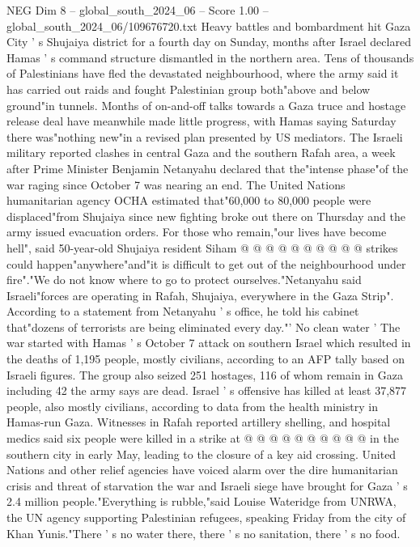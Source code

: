 \begin{textsample}{NEG Dim 8 – global\_south\_2024\_06 – Score 1.00 – global\_south\_2024\_06/109676720.txt}  \label{ex:f8_neg_244}
Heavy battles and bombardment hit Gaza City ' s Shujaiya district for a fourth day on Sunday, months after Israel declared Hamas ' s command structure dismantled in the northern area.
Tens of thousands of Palestinians have fled the devastated neighbourhood, where the army said it has carried out raids and fought Palestinian group both"above and below ground"in tunnels.
Months of on-and-off talks towards a Gaza truce and hostage release deal have meanwhile made little progress, with Hamas saying Saturday there was"nothing new"in a revised plan presented by US mediators.
The Israeli military reported clashes in central Gaza and the southern Rafah area, a week after Prime Minister Benjamin Netanyahu declared that the"intense phase"of the war raging since October 7 was nearing an end.
The United Nations humanitarian agency OCHA estimated that"60,000 to 80,000 people were displaced"from Shujaiya since new fighting broke out there on Thursday and the army issued evacuation orders.
For those who remain,"our lives have become hell", said 50-year-old Shujaiya resident Siham @ @ @ @ @ @ @ @ @ @ strikes could happen"anywhere"and"it is difficult to get out of the neighbourhood under fire"."We do not know where to go to protect ourselves."Netanyahu said Israeli"forces are operating in Rafah, Shujaiya, everywhere in the Gaza Strip".
According to a statement from Netanyahu ' s office, he told his cabinet that"dozens of terrorists are being eliminated every day."' No clean water ' The war started with Hamas ' s October 7 attack on southern Israel which resulted in the deaths of 1,195 people, mostly civilians, according to an AFP tally based on Israeli figures.
The group also seized 251 hostages, 116 of whom remain in Gaza including 42 the army says are dead.
Israel ' s offensive has killed at least 37,877 people, also mostly civilians, according to data from the health ministry in Hamas-run Gaza.
Witnesses in Rafah reported artillery shelling, and hospital medics said six people were killed in a strike at @ @ @ @ @ @ @ @ @ @ in the southern city in early May, leading to the closure of a key aid crossing.
United Nations and other relief agencies have voiced alarm over the dire humanitarian crisis and threat of starvation the war and Israeli siege have brought for Gaza ' s 2.4 million people."Everything is rubble,"said Louise Wateridge from UNRWA, the UN agency supporting Palestinian refugees, speaking Friday from the city of Khan Yunis."There ' s no water there, there ' s no sanitation, there ' s no food.

\end{textsample}
